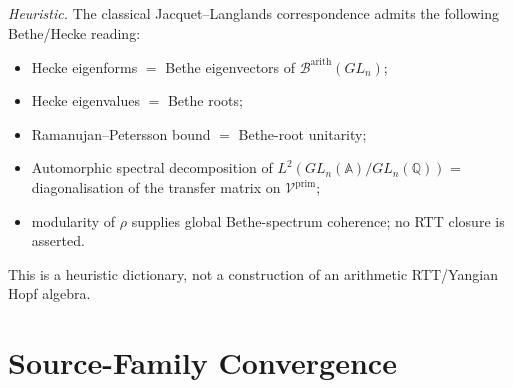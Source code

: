 \begin{theorem}
\label{v4-arith:thm:langlands-bethe}
\emph{Heuristic.} The classical Jacquet--Langlands
correspondence admits the following Bethe/Hecke reading:
\begin{itemize}
\item Hecke eigenforms \(=\) Bethe eigenvectors of
\(\mathcal{B}^{\mathrm{arith}}(GL_{n})\);
\item Hecke eigenvalues \(=\) Bethe roots;
\item Ramanujan--Petersson bound \(=\) Bethe-root unitarity;
\item Automorphic spectral decomposition of
\(L^{2}(GL_{n}(\mathbb{A})/GL_{n}(\mathbb{Q}))\) = diagonalisation
of the transfer matrix on \(\mathcal{V}^{\mathrm{prim}}\);
\item modularity of \(\rho\) supplies global Bethe-spectrum coherence;
no RTT closure is asserted.
\end{itemize}
This is a heuristic dictionary, not a construction of an arithmetic
RTT/Yangian Hopf algebra.
\end{theorem}

\section{Source-Family Convergence}
\label{v4-arith:syn:convergence}

